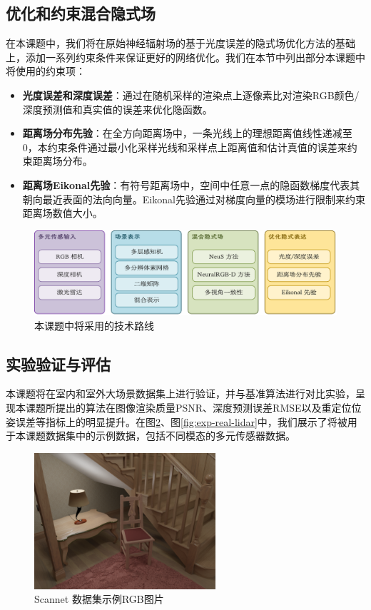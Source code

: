 \subsection{优化和约束混合隐式场}
\label{subsec:optimization}
在本课题中，我们将在原始神经辐射场的基于光度误差的隐式场优化方法的基础上，添加一系列约束条件来保证更好的网络优化。我们在本节中列出部分本课题中将使用的约束项：
\begin{itemize}
    \item \textbf{光度误差和深度误差}：通过在随机采样的渲染点上逐像素比对渲染RGB颜色/深度预测值和真实值的误差来优化隐函数。
    \item \textbf{距离场分布先验}：在全方向距离场中，一条光线上的理想距离值线性递减至0，本约束条件通过最小化采样光线和采样点上距离值和估计真值的误差来约束距离场分布。
    \item \textbf{距离场Eikonal先验}：有符号距离场中，空间中任意一点的隐函数梯度代表其朝向最近表面的法向向量。Eikonal先验\cite{wang_neus_2021}通过对梯度向量的模场进行限制来约束距离场数值大小。
\end{itemize}

\begin{figure}[t]
    \centering
    \includegraphics[width=\textwidth]{undergraduate-thesis/images/method.pdf}
    \caption{本课题中将采用的技术路线}
    \label{fig:method}
\end{figure}

\subsection{实验验证与评估}
\label{subsec:exp-and-evaluation}
本课题将在室内和室外大场景数据集上进行验证，并与基准算法进行对比实验，呈现本课题所提出的算法在图像渲染质量PSNR、深度预测误差RMSE以及重定位位姿误差等指标上的明显提升。在图\ref{fig:exp-scannet-rgb}、图\ref{fig:exp-real-lidar}中，我们展示了将被用于本课题数据集中的示例数据，包括不同模态的多元传感器数据。

\begin{figure}
    \centering
    \includegraphics[width=0.6\textwidth]{undergraduate-thesis/images/scannet-rgb.png}
    \caption{Scannet 数据集示例RGB图片}
    \label{fig:exp-scannet-rgb}
\end{figure}

